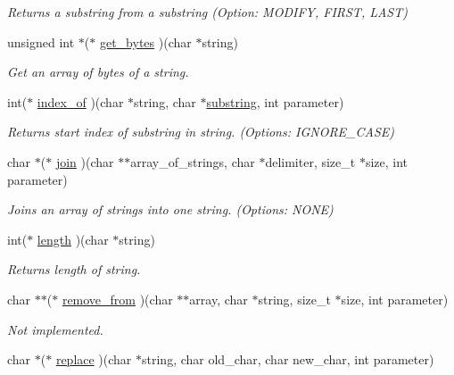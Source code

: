 \begin{DoxyCompactItemize}
\begin{DoxyCompactList}\small\item\em Returns a substring from a substring (Option\+: M\+O\+D\+I\+F\+Y, F\+I\+R\+S\+T, L\+A\+S\+T) \end{DoxyCompactList}\item 
unsigned int $\ast$($\ast$ \hyperlink{struct_string___utils_acb4ba735906a187651cb53538f6ec070}{get\+\_\+bytes} )(char $\ast$string)
\begin{DoxyCompactList}\small\item\em Get an array of bytes of a string. \end{DoxyCompactList}\item 
int($\ast$ \hyperlink{struct_string___utils_a4c735a3556a0e63300f6c23e36668d08}{index\+\_\+of} )(char $\ast$string, char $\ast$\hyperlink{struct_string___utils_a381c718b857c1e1791c0528134a53947}{substring}, int parameter)
\begin{DoxyCompactList}\small\item\em Returns start index of substring in string. (Options\+: I\+G\+N\+O\+R\+E\+\_\+\+C\+A\+S\+E) \end{DoxyCompactList}\item 
char $\ast$($\ast$ \hyperlink{struct_string___utils_ac942d3f461814d4649f55f5bf577b954}{join} )(char $\ast$$\ast$array\+\_\+of\+\_\+strings, char $\ast$delimiter, size\+\_\+t $\ast$size, int parameter)
\begin{DoxyCompactList}\small\item\em Joins an array of strings into one string. (Options\+: N\+O\+N\+E) \end{DoxyCompactList}\item 
int($\ast$ \hyperlink{struct_string___utils_a58de371476767a271dc657f57f5bd5da}{length} )(char $\ast$string)
\begin{DoxyCompactList}\small\item\em Returns length of string. \end{DoxyCompactList}\item 
char $\ast$$\ast$($\ast$ \hyperlink{struct_string___utils_abfe28f997f8aeb3f694f6077b2074fe5}{remove\+\_\+from} )(char $\ast$$\ast$array, char $\ast$string, size\+\_\+t $\ast$size, int parameter)
\begin{DoxyCompactList}\small\item\em Not implemented. \end{DoxyCompactList}\item 
char $\ast$($\ast$ \hyperlink{struct_string___utils_ab981dab5e80222905fd97d838ad82219}{replace} )(char $\ast$string, char old\+\_\+char, char new\+\_\+char, int parameter)
$$
\end{DoxyCompactItemize}
